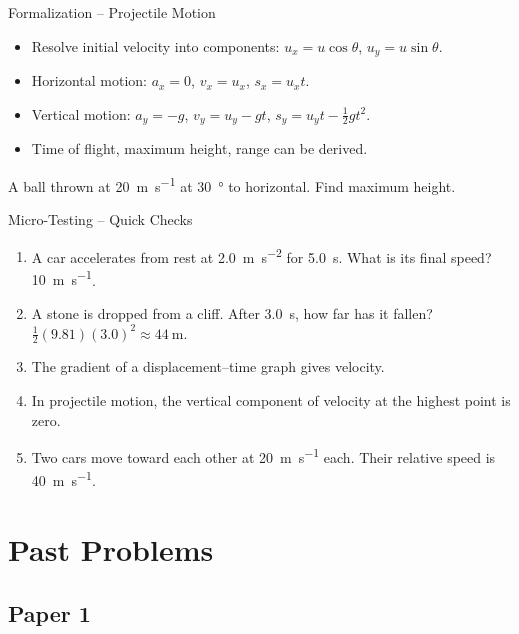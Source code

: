 \documentclass{beamer}
\begin{document}
\begin{frame}{Formalization – Projectile Motion}
\begin{itemize}
    \item Resolve initial velocity into components: $u_x = u\cos\theta$, $u_y = u\sin\theta$.
    \item Horizontal motion: $a_x = 0$, $v_x = u_x$, $s_x = u_x t$.
    \item Vertical motion: $a_y = -g$, $v_y = u_y - gt$, $s_y = u_y t - \frac12 gt^2$.
    \item Time of flight, maximum height, range can be derived.
\end{itemize}
\vfill
\begin{example}
A ball thrown at \SI{20}{\meter\per\second} at \SI{30}{\degree} to horizontal.
Find maximum height.
\end{example}
\end{frame}

\begin{frame}[t,shrink=15]{Micro-Testing – Quick Checks}
\begin{enumerate}
    \item A car accelerates from rest at \SI{2.0}{\meter\per\second\squared} for \SI{5.0}{\second}. What is its final speed? \pause \alert{\SI{10}{\meter\per\second}}.
    \item A stone is dropped from a cliff. After \SI{3.0}{\second}, how far has it fallen? \pause \alert{$\frac12 (9.81)(3.0)^2 \approx \SI{44}{\meter}$}.
    \item The gradient of a displacement–time graph gives \pause \alert{velocity}.
    \item In projectile motion, the vertical component of velocity at the highest point is \pause \alert{zero}.
    \item Two cars move toward each other at \SI{20}{\meter\per\second} each. Their relative speed is \pause \alert{\SI{40}{\meter\per\second}}.
\end{enumerate}
\end{frame}

\section{Past Problems}

\subsection{Paper 1}
\end{document}
